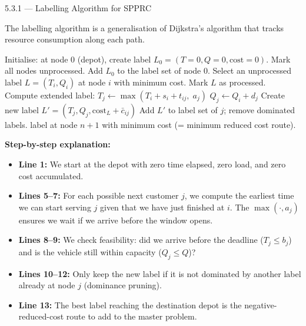 \documentclass[aspectratio=169,10pt]{beamer}
\begin{document}
\begin{frame}[allowframebreaks]{5.3.1 --- Labelling Algorithm for SPPRC}

The labelling algorithm is a generalisation of Dijkstra's algorithm that tracks
resource consumption along each path.

\begin{algorithm}[H]
\caption{Forward Labelling Algorithm for SPPRC}
\begin{algorithmic}[1]
\State Initialise: at node $0$ (depot), create label $L_0 = (T=0, Q=0, \text{cost}=0)$.
\State Mark all nodes unprocessed.  Add $L_0$ to the label set of node 0.
  \State Select an unprocessed label $L = (T_i, Q_i)$ at node $i$ with minimum cost.
  \State Mark $L$ as processed.
    \State Compute extended label: $T_j \leftarrow \max(T_i + s_i + t_{ij},\; a_j)$
    \State $Q_j \leftarrow Q_i + d_j$
      \State Create new label $L' = (T_j, Q_j, \text{cost}_L + \bar{c}_{ij})$
        \State Add $L'$ to label set of $j$; remove dominated labels.
      \EndIf
    \EndIf
  \EndFor
\EndWhile
\State \Return label at node $n+1$ with minimum cost (= minimum reduced cost route).
\end{algorithmic}
\end{algorithm}

\textbf{Step-by-step explanation:}
\begin{itemize}
  \item \textbf{Line 1:} We start at the depot with zero time elapsed, zero load,
    and zero cost accumulated.
  \item \textbf{Lines 5--7:} For each possible next customer $j$, we compute the
    earliest time we can start serving $j$ given that we have just finished at $i$.
    The $\max(\cdot, a_j)$ ensures we wait if we arrive before the window opens.
  \item \textbf{Lines 8--9:} We check feasibility: did we arrive before the deadline
    ($T_j \leq b_j$) and is the vehicle still within capacity ($Q_j \leq Q$)?
  \item \textbf{Lines 10--12:} Only keep the new label if it is not dominated by
    another label already at node $j$ (dominance pruning).
  \item \textbf{Line 13:} The best label reaching the destination depot is the
    negative-reduced-cost route to add to the master problem.
\end{itemize}

\end{frame}
\end{document}
